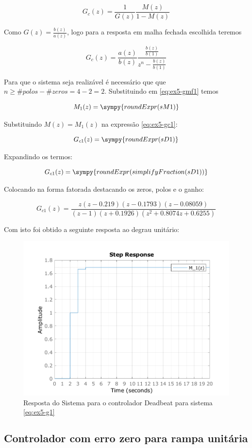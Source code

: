 \documentclass[a4paper,11pt]{article}
\begin{document}
$$
    G_{c}(z) = \frac{1}{G(z)}\frac{M(z)}{1-M(z)}
$$

Como $G(z) = \frac{b(z)}{a(z)}$, logo para a resposta em malha fechada escolhida teremos

\begin{equation}\label{eq:ex5-gc1}
    G_{c}(z) = \frac{a(z)}{b(z)}\frac{\frac{b(z)}{b(1)}}{z^n-\frac{b(z)}{b(1)}}
\end{equation}


Para que o sistema seja realizável é necessário que que $n \ge \#polos - \#zeros = 4  - 2 = 2$. Substituindo em \ref{eq:ex5-gmf1} temos

$$
M_1(z) = \sympy{roundExpr(sM1)}
$$

Substituindo $M(z) = M_1(z)$ na expressão \ref{eq:ex5-gc1}:

$$G_{c1}(z) = \sympy{roundExpr(sD1)}$$

Expandindo os termos:

$$G_{c1}(z) = \sympy{roundExpr(simplifyFraction(sD1))}$$

Colocando na forma fatorada destacando os zeros, polos e o ganho:

\begin{equation}
    G_{c1}(z) = \frac{z (z-0.219) (z-0.1793) (z-0.08059)}{(z-1) (z+0.1926) (z^2 + 0.8074z + 0.6255)}
\end{equation}

Com isto foi obtido a seguinte resposta ao degrau unitário:

\begin{figure}[H]
    \centering
    \includegraphics[width=0.6\linewidth]{img/exsim5-g1-deadbeat-sim.png}
    \caption{Resposta do Sistema para o controlador Deadbeat para sistema \ref{eq:ex5-g1}}
\end{figure}

\subsection{Controlador com erro zero para rampa unitária}
\end{document}
